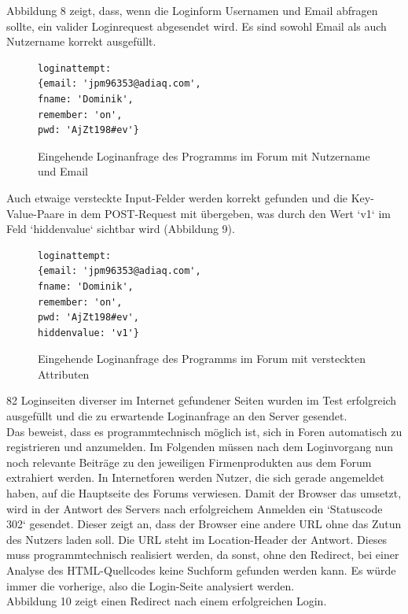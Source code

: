 Abbildung 8 zeigt, dass, wenn die Loginform Usernamen und Email abfragen sollte, ein valider Loginrequest abgesendet wird. Es sind sowohl Email als auch Nutzername korrekt ausgefüllt.

\begin{figure}[h!]
\begin{lstlisting}[language=HTML5]
loginattempt:
{email: 'jpm96353@adiaq.com',
fname: 'Dominik',
remember: 'on',
pwd: 'AjZt198#ev'}
\end{lstlisting}
\caption{Eingehende Loginanfrage des Programms im Forum mit Nutzername und Email}
\end{figure}

Auch etwaige versteckte Input-Felder werden korrekt gefunden und die Key-Value-Paare in dem POST-Request mit übergeben, was durch den Wert `v1` im Feld `hiddenvalue` sichtbar wird (Abbildung 9).

\begin{figure}[h!]
\begin{lstlisting}[language=HTML5]
loginattempt:
{email: 'jpm96353@adiaq.com',
fname: 'Dominik',
remember: 'on',
pwd: 'AjZt198#ev',
hiddenvalue: 'v1'}
\end{lstlisting}
\caption{Eingehende Loginanfrage des Programms im Forum mit versteckten Attributen}
\end{figure}


82 Loginseiten diverser im Internet gefundener Seiten wurden im Test erfolgreich ausgefüllt und die zu erwartende Loginanfrage an den Server gesendet.\\
Das beweist, dass es programmtechnisch möglich ist, sich in Foren automatisch zu registrieren und anzumelden. Im Folgenden müssen nach dem Loginvorgang nun noch relevante Beiträge zu den jeweiligen Firmenprodukten aus dem Forum extrahiert werden.\newline
In Internetforen werden Nutzer, die sich gerade angemeldet haben, auf die Hauptseite des Forums verwiesen. Damit der Browser das umsetzt, wird in der Antwort des Servers nach erfolgreichem Anmelden ein `Statuscode 302` gesendet. Dieser zeigt an, dass der Browser eine andere URL ohne das Zutun des Nutzers laden soll. Die URL steht im Location-Header der Antwort. Dieses muss programmtechnisch realisiert werden, da sonst, ohne den Redirect, bei einer Analyse des HTML-Quellcodes keine Suchform gefunden werden kann. Es würde immer die vorherige, also die Login-Seite analysiert werden.\\
Abbildung 10 zeigt einen Redirect nach einem erfolgreichen Login.

